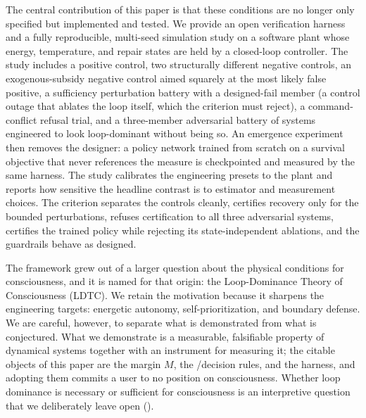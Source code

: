 \documentclass[11pt]{article}
\begin{document}
The central contribution of this paper is that these conditions are no longer only specified but implemented and tested. We provide an open verification harness and a fully reproducible, multi-seed simulation study on a software plant whose energy, temperature, and repair states are held by a closed-loop controller. The study includes a positive control, two structurally different negative controls, an exogenous-subsidy negative control aimed squarely at the most likely false positive, a sufficiency perturbation battery with a designed-fail member (a control outage that ablates the loop itself, which the criterion must reject), a command-conflict refusal trial, and a three-member adversarial battery of systems engineered to look loop-dominant without being so. An emergence experiment then removes the designer: a policy network trained from scratch on a survival objective that never references the measure is checkpointed and measured by the same harness. The study calibrates the engineering presets to the plant and reports how sensitive the headline contrast is to estimator and measurement choices. The criterion separates the controls cleanly, certifies recovery only for the bounded perturbations, refuses certification to all three adversarial systems, certifies the trained policy while rejecting its state-independent ablations, and the guardrails behave as designed.

The framework grew out of a larger question about the physical conditions for consciousness, and it is named for that origin: the Loop-Dominance Theory of Consciousness (LDTC). We retain the motivation because it sharpens the engineering targets: energetic autonomy, self-prioritization, and boundary defense. We are careful, however, to separate what is demonstrated from what is conjectured. What we demonstrate is a measurable, falsifiable property of dynamical systems together with an instrument for measuring it; the citable objects of this paper are the margin $M$, the \NC/\SC decision rules, and the harness, and adopting them commits a user to no position on consciousness. Whether loop dominance is necessary or sufficient for consciousness is an interpretive question that we deliberately leave open ().
\end{document}
